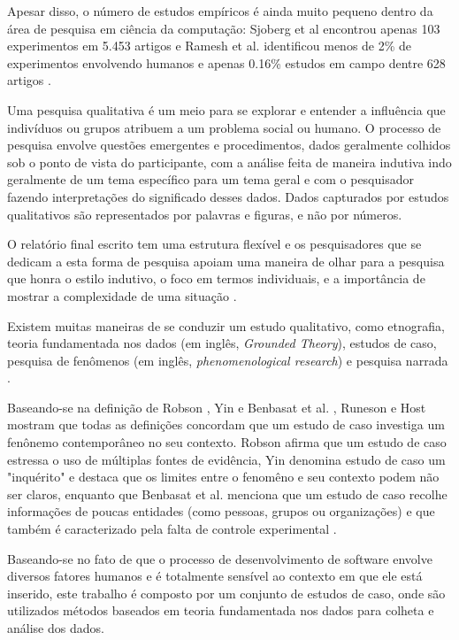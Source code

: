 Apesar disso, o número de estudos empíricos é ainda muito pequeno dentro da área
de pesquisa em ciência da computação: Sjoberg et al encontrou apenas 103
experimentos em 5.453 artigos \cite{sjoberg} e Ramesh et al. identificou menos
de 2\% de experimentos envolvendo humanos e apenas 0.16\% estudos em campo 
dentre 628 artigos \cite{ramesh} .

Uma pesquisa qualitativa é um meio para se explorar e entender a influência que 
indivíduos ou grupos atribuem a um problema social ou humano. O processo de
pesquisa envolve questões emergentes e procedimentos, dados geralmente colhidos
sob o ponto de vista do participante, com a análise feita de maneira indutiva
indo  geralmente de um tema específico para um tema geral e com o pesquisador
fazendo interpretações do significado desses dados. Dados capturados por estudos
qualitativos são representados por palavras e figuras, e não por números.

O relatório final escrito tem uma estrutura flexível e os pesquisadores que se
dedicam a esta forma de pesquisa apoiam uma maneira de olhar para a pesquisa que
honra o estilo indutivo, o foco em termos individuais, e a importância de mostrar a 
complexidade de uma situação \cite{creswell}. 

Existem muitas maneiras de se conduzir um estudo qualitativo, como etnografia,
teoria fundamentada nos dados (em inglês, \textit{Grounded Theory}), estudos de 
caso, pesquisa de fenômenos (em inglês, \textit{phenomenological research}) e 
pesquisa narrada \cite{creswell}. 

Baseando-se na definição de Robson \cite{robson}, Yin \cite{yin} e Benbasat et
al. \cite{benbasat}, Runeson e Host mostram que todas as definições concordam
que um estudo de caso investiga um fenônemo contemporâneo no seu contexto. 
Robson afirma que um estudo de caso estressa o uso de múltiplas fontes de
evidência, Yin denomina estudo de caso um "inquérito" e destaca que os limites 
entre o fenomêno e seu contexto podem não ser claros, enquanto que Benbasat et
al. menciona que um estudo de caso recolhe informações de poucas entidades 
(como pessoas, grupos ou organizações) e que também é caracterizado pela  falta
de controle experimental \cite{guidelines-case-study}.

Baseando-se no fato de que o processo de desenvolvimento de software envolve 
diversos fatores humanos e é totalmente sensível ao contexto em que ele está 
inserido, este trabalho é composto por um conjunto de estudos de caso, onde são 
utilizados métodos baseados em teoria fundamentada nos dados para colheta e
análise dos dados.

